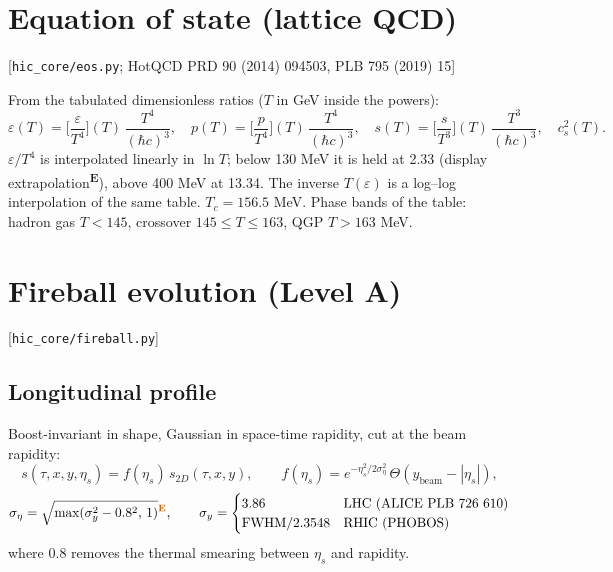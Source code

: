 \documentclass[11pt,a4paper]{article}
\newcommand{\file}[1]{\texttt{\small #1}}
\newcommand{\src}[1]{\hfill{\small\color{gray}[#1]}}
\newcommand{\emp}{\textsuperscript{\color{orange!80!black}\textbf{E}}}
\begin{document}
\section{Equation of state (lattice QCD)}
\src{\file{hic\_core/eos.py}; HotQCD PRD 90 (2014) 094503, PLB 795 (2019) 15}

From the tabulated dimensionless ratios ($T$ in GeV inside the powers):
\begin{equation}
\varepsilon(T) = \Big[\frac{\varepsilon}{T^4}\Big](T)\,\frac{T^4}{(\hbar c)^3},\quad
p(T) = \Big[\frac{p}{T^4}\Big](T)\,\frac{T^4}{(\hbar c)^3},\quad
s(T) = \Big[\frac{s}{T^3}\Big](T)\,\frac{T^3}{(\hbar c)^3},\quad c_s^2(T).
\end{equation}
$\varepsilon/T^4$ is interpolated linearly in $\ln T$; below 130 MeV it is held at 2.33 (display extrapolation\emp), above
400 MeV at 13.34. The inverse $T(\varepsilon)$ is a log--log interpolation of the same table.
$T_c = 156.5$ MeV. Phase bands of the table: hadron gas $T<145$, crossover $145\le T\le163$, QGP $T>163$ MeV.

\section{Fireball evolution (Level A)}
\src{\file{hic\_core/fireball.py}}

\subsection{Longitudinal profile}
Boost-invariant in shape, Gaussian in space-time rapidity, cut at the beam rapidity:
\begin{equation}
s(\tau,x,y,\eta_s) = f(\eta_s)\,s_{2D}(\tau,x,y),\qquad
f(\eta_s) = e^{-\eta_s^2/2\sigma_\eta^2}\,\Theta(y_\text{beam}-|\eta_s|),
\end{equation}
\begin{equation}
\sigma_\eta = \sqrt{\max(\sigma_y^2-0.8^2,\,1)}\emp,\qquad
\sigma_y = \begin{cases} 3.86 & \text{LHC (ALICE PLB 726 610)}\\ \text{FWHM}/2.3548 & \text{RHIC (PHOBOS)}\end{cases}
\end{equation}
where $0.8$ removes the thermal smearing between $\eta_s$ and rapidity.
\end{document}
